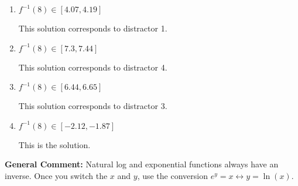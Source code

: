 \documentclass{extbook}[14pt]
\begin{document}
\begin{enumerate}
{\begin{enumerate}[label=\Alph*.]
 This solution corresponds to distractor 2.
\item \( f^{-1}(8) \in [4.07, 4.19] \)

 This solution corresponds to distractor 1.
\item \( f^{-1}(8) \in [7.3, 7.44] \)

 This solution corresponds to distractor 4.
\item \( f^{-1}(8) \in [6.44, 6.65] \)

 This solution corresponds to distractor 3.
\item \( f^{-1}(8) \in [-2.12, -1.87] \)

 This is the solution.
\end{enumerate}

\textbf{General Comment:} Natural log and exponential functions always have an inverse. Once you switch the $x$ and $y$, use the conversion $ e^y = x \leftrightarrow y=\ln(x)$.
}
\end{enumerate}
\end{document}
